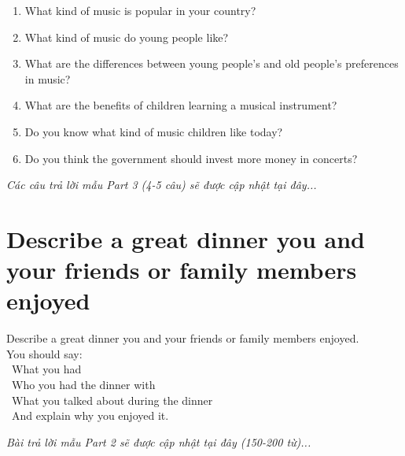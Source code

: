 \begin{ieltsprompt}
\begin{enumerate}[itemsep=4pt]
    \item What kind of music is popular in your country?
    \item What kind of music do young people like?
    \item What are the differences between young people's and old people's preferences in music?
    \item What are the benefits of children learning a musical instrument?
    \item Do you know what kind of music children like today?
    \item Do you think the government should invest more money in concerts?
\end{enumerate}
\end{ieltsprompt}

\vspace{1em}
\textit{Các câu trả lời mẫu Part 3 (4-5 câu) sẽ được cập nhật tại đây...}
\vspace{2em}

\section{Describe a great dinner you and your friends or family members enjoyed}
\begin{ieltsprompt}
Describe a great dinner you and your friends or family members enjoyed. \\
You should say: \\
\textbullet\ What you had \\
\textbullet\ Who you had the dinner with \\
\textbullet\ What you talked about during the dinner \\
\textbullet\ And explain why you enjoyed it. \\
\end{ieltsprompt}

\vspace{1em}
\textit{Bài trả lời mẫu Part 2 sẽ được cập nhật tại đây (150-200 từ)...}
\vspace{2em}

